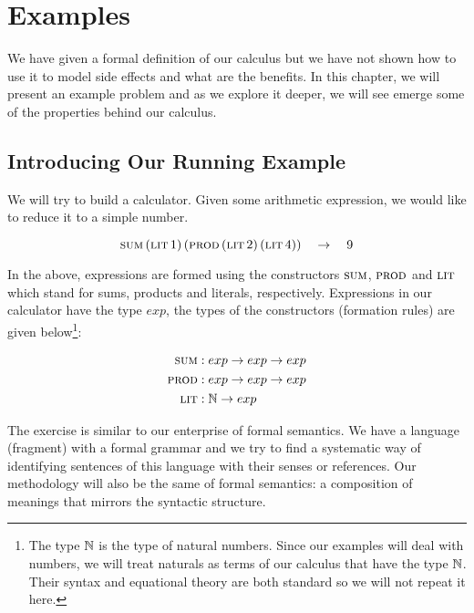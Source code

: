 \chapter{Examples}
\label{chap:examples}

We have given a formal definition of our calculus but we have not shown how
to use it to model side effects and what are the benefits. In this chapter,
we will present an example problem and as we explore it deeper, we will see
emerge some of the properties behind our calculus.

\minitoc

\section{Introducing Our Running Example}

We will try to build a calculator. Given some arithmetic expression, we
would like to reduce it to a simple number. 

$$
\textsc{sum}\,(\textsc{lit}\,1)\,(\textsc{prod}\,(\textsc{lit}\,2)\,(\textsc{lit}\,4))
\quad \to \quad 9
$$

In the above, expressions are formed using the constructors $\textsc{sum}$,
$\textsc{prod}$ and $\textsc{lit}$ which stand for sums, products and literals,
respectively. Expressions in our calculator have the type $exp$, the types
of the constructors (formation rules) are given below\footnote{The type
  $\mathbb{N}$ is the type of natural numbers. Since our examples will deal with
  numbers, we will treat naturals as terms of our calculus that have the
  type $\mathbb{N}$. Their syntax and equational theory are both standard so we
  will not repeat it here.}:

\begin{align*}
  \textsc{sum} &: exp \to exp \to exp \\
  \textsc{prod} &: exp \to exp \to exp \\
  \textsc{lit} &: \mathbb{N} \to exp
\end{align*}

The exercise is similar to our enterprise of formal semantics. We have a
language (fragment) with a formal grammar and we try to find a systematic
way of identifying sentences of this language with their senses or
references. Our methodology will also be the same of formal semantics: a
composition of meanings that mirrors the syntactic structure.

